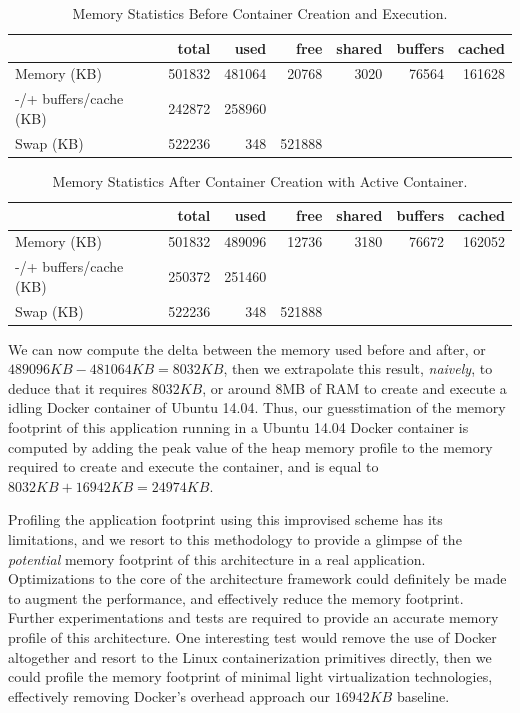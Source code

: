 \documentclass[12pt, titlepage]{uo_temp}
\begin{document}
     \begin{table}[h!]\label{mem_b4}
       \begin{tabular}{l*{6}{r}}

         & total & used & free & shared & buffers & cached\\ \hline \hline
         Memory (KB) & 501832 & 481064 & 20768 & 3020 & 76564 & 161628 \\ 
         -/+ buffers/cache (KB) & 242872 & 258960 &&&&\\
         Swap (KB) & 522236 & 348 & 521888 &&&\\
         \hline

       \end{tabular}
       \caption{Memory Statistics Before Container Creation and Execution.}
     \end{table}

     \begin{table}[h!]\label{mem_after}
       \begin{tabular}{l*{6}{r}}

         & total & used & free & shared & buffers & cached\\ \hline \hline
         Memory (KB) & 501832 & 489096 & 12736 & 3180 & 76672 & 162052 \\ 
         -/+ buffers/cache (KB) & 250372 & 251460 &&&&\\
         Swap (KB) & 522236 & 348 & 521888 &&&\\
         \hline

       \end{tabular}

       \caption{Memory Statistics After Container Creation with Active Container.}
     \end{table}
     We can now compute the delta between the memory used before and after, or
     $489096KB - 481064KB = 8032 KB$, then we extrapolate this result, \emph{naively}, to deduce
     that it requires $8032KB$, or around 8MB of RAM to create and execute a idling Docker
     container of Ubuntu 14.04. Thus, our guesstimation of the memory footprint of this
     application running in a Ubuntu 14.04 Docker container is computed by adding the peak
     value of the heap memory profile to the memory required to create and execute the
     container, and is equal to $8032KB + 16942KB = 24974KB$.

     Profiling the application footprint using this improvised scheme has its limitations,
     and we resort to this methodology to provide a glimpse of the \emph{potential} memory
     footprint of this architecture in a real application. Optimizations to the core of
     the architecture framework could definitely be made to augment the performance, and
     effectively reduce the memory footprint. Further experimentations and tests are
     required to provide an accurate memory profile of this architecture. One interesting
     test would remove the use of Docker altogether and resort to the Linux
     containerization primitives directly, then we could profile the memory footprint of
     minimal light virtualization technologies, effectively removing Docker's overhead
     approach our $16942KB$ baseline.
\end{document}
